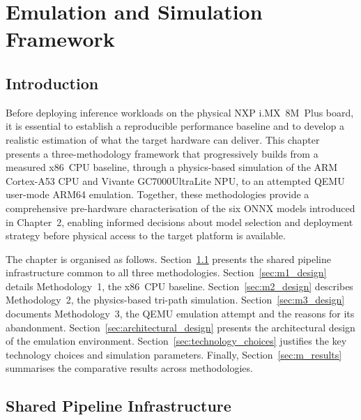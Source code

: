 
\chapter{Emulation and Simulation Framework}
\label{chap:emulation}

\section*{Introduction}
Before deploying inference workloads on the physical NXP i.MX~8M~Plus board,
it is essential to establish a reproducible performance baseline and to develop
a realistic estimation of what the target hardware can deliver. This chapter
presents a three-methodology framework that progressively builds from a
measured x86~CPU baseline, through a physics-based simulation of the ARM
Cortex-A53 CPU and Vivante GC7000UltraLite NPU, to an attempted QEMU
user-mode ARM64 emulation. Together, these methodologies provide a
comprehensive pre-hardware characterisation of the six ONNX models introduced
in Chapter~2, enabling informed decisions about model selection and deployment
strategy before physical access to the target platform is available.

The chapter is organised as follows.
Section~\ref{sec:pipeline_overview} presents the shared pipeline infrastructure
common to all three methodologies.
Section~\ref{sec:m1_design} details Methodology~1, the x86~CPU baseline.
Section~\ref{sec:m2_design} describes Methodology~2, the physics-based
tri-path simulation.
Section~\ref{sec:m3_design} documents Methodology~3, the QEMU emulation
attempt and the reasons for its abandonment.
Section~\ref{sec:architectural_design} presents the architectural design of
the emulation environment.
Section~\ref{sec:technology_choices} justifies the key technology choices and
simulation parameters.
Finally, Section~\ref{sec:m_results} summarises the comparative results across
methodologies.

\section{Shared Pipeline Infrastructure}
\label{sec:pipeline_overview}

